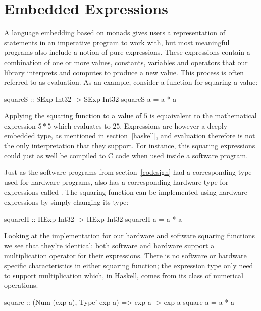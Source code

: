 \documentclass[../main.tex]{subfiles}
\begin{document}
\section{Embedded Expressions}
\label{expr}

A language embedding based on monads gives users a representation of statements in an imperative program to work with, but most meaningful programs also include a notion of pure expressions. These expressions contain a combination of one or more values, constants, variables and operators that our library interprets and computes to produce a new value. This process is often referred to as evaluation. As an example, consider a function for squaring a value:

\begin{code}
squareS :: SExp Int32 -> SExp Int32
squareS a = a * a
\end{code}

\noindent Applying the squaring function to a value of $5$ is equaivalent to the mathematical expression $5*5$ which evaluates to $25$. Expressions are however a deeply embedded type, as mentioned in section~\ref{haskell}, and evaluation therefore is not the only interpretation that they support. For instance, this squaring expressions could just as well be compiled to C code when used inside a software program.

Just as the software programs from section~\ref{codesign} had a corresponding type used for hardware programs,  also has a corresponding hardware type for expressions called . The squaring function can be implemented using hardware expressions by simply changing its type:

\begin{stub}
squareH :: HExp Int32 -> HExp Int32
squareH a = a * a
\end{stub}

Looking at the implementation for our hardware and software squaring functions we see that they're identical; both software and hardware support a multiplication operator for their expressions. There is no software or hardware specific characteristics in either squaring function; the expression type only need to support multiplication which, in Haskell, comes from its  class of numerical operations.

\begin{code}
square :: (Num (exp a), Type' exp a) => exp a -> exp a
square a = a * a
\end{code}
\end{document}
